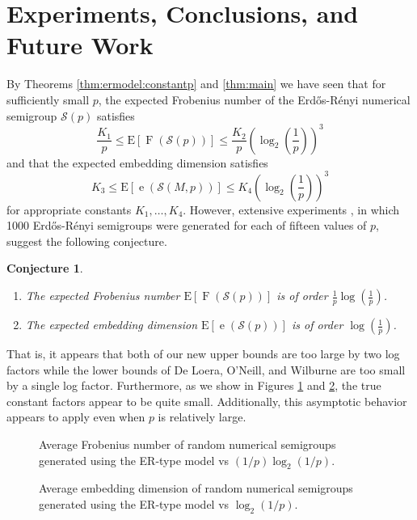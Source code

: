 \documentclass[11pt]{amsart}
\newtheorem{conjecture}[theorem]{Conjecture}
\theoremstyle{definition}
\theoremstyle{remark}
\def\EE{\ensuremath{\mathrm{E}}}
\def\nsg{\ensuremath{\mathcal{S}}}
\DeclareMathOperator\F{F}
\DeclareMathOperator\e{e}
\begin{document}
\section{Experiments, Conclusions, and Future Work}
By Theorems \ref{thm:ermodel:constantp} and \ref{thm:main} we have seen that for sufficiently small $p$, the expected Frobenius number of the  Erd\H{o}s-R\'enyi numerical semigroup $\nsg(p)$ satisfies
\[ \frac{K_1}{p} \leq \EE[\F(\nsg(p))] \leq \frac{K_2}{p} \left( \log_2 \left(\frac{1}{p}\right)\right)^3 \]
and that the expected embedding dimension satisfies
\[ K_3 \leq \EE[\e(\nsg(M,p))] \leq K_4 \left( \log_2 \left(\frac{1}{p}\right)\right)^3 \] 
for appropriate constants $K_1, \dots, K_4$. However, extensive experiments \cite{Morales_data}, in which 1000 Erd\H{o}s-R\'enyi semigroups were generated for each of fifteen values of $p$, suggest the following conjecture.
\begin{conjecture}
  \begin{enumerate}
  \item The expected Frobenius number $\EE[\F(\nsg(p))]$ is of order $\frac{1}{p} \log \left(\frac{1}{p}\right)$.
  \item The expected embedding dimension $\EE[\e(\nsg(p))]$ is of order $\log \left(\frac{1}{p}\right)$. 
  \end{enumerate}
  \end{conjecture}
That is, it appears that both of our new upper bounds are too large by two log factors while the lower bounds of De Loera, O'Neill, and Wilburne are too small by a single log factor. Furthermore, as we show in Figures \ref{fig:frobenius} and \ref{fig:embedding}, the true constant factors appear to be quite small. Additionally, this asymptotic behavior appears to apply even when $p$ is relatively large. 
\begin{figure}[ht]
            \begin{center}
                \scalebox{0.6}{}
            \end{center}
            \caption{Average Frobenius number of random numerical semigroups generated using the ER-type model vs $(1/p)\log_2(1/p)$.}
            \label{fig:frobenius}
\end{figure}

\begin{figure}[ht]
        \begin{center}
            \scalebox{0.6}{}
        \end{center}
        \caption{Average embedding dimension of random numerical semigroups generated using the ER-type model vs $\log_2(1/p)$.}
        \label{fig:embedding}
\end{figure}
\end{document}
